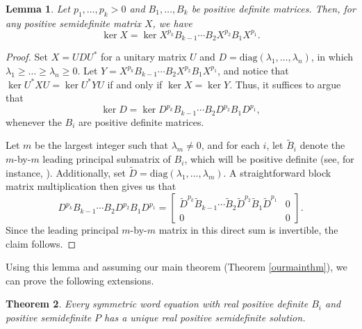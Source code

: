 \documentclass{amsart}
\newtheorem{thm}{Theorem}[section]
\newtheorem{lem}[thm]{Lemma}
\theoremstyle{definition}
\theoremstyle{remark}
\numberwithin{equation}{section}
\newcommand{\<}{\langle}
\renewcommand{\>}{\rangle}
\begin{document}
\begin{lem}\label{kerlemma}
Let $p_1,\ldots,p_k > 0$ and $B_1,\ldots,B_k$ be positive definite
matrices. Then, for any positive semidefinite matrix $X$, we have
\[ \ker X = \ker X^{p_{k}}B_{k-1}  \cdots B_2 X^{p_2}B_1 X^{p_1}.\]
\end{lem}

\begin{proof}
Set $X = UDU^*$ for a unitary matrix $U$ and $D = \text{diag}(\lambda_1,\ldots,\lambda_n)$, in which $\lambda_1 \geq \ldots \geq \lambda_n \geq 0$.  Let $Y=X^{p_{k}}B_{k-1} \cdots B_2 X^{p_2}B_1 X^{p_1}$, and notice that $\ker U^*XU = \ker U^*YU$ if and only if $\ker X = \ker Y$.  Thus, it suffices to argue that \[ \ker D = \ker D^{p_{k}}B_{k-1} \cdots B_2 D^{p_2} B_1 D^{p_1}, \] whenever the $B_i$ are positive definite matrices.

Let $m$ be the largest integer such that $\lambda_m  \neq 0$, and for each $i$, let $\widetilde B_i$ denote the $m$-by-$m$ leading principal submatrix of $B_i$, which will be positive definite (see, for instance, \cite[p.472]{HJ1}).  Additionally, set $\widetilde D = \text{diag}(\lambda_1,\ldots,\lambda_m)$.  A straightforward block matrix multiplication then gives us that \[D^{p_{k}} B_{k-1} \cdots B_2 D^{p_2} B_1 D^{p_1} = \left[\begin{array}{cc} \widetilde D^{p_{k}} \widetilde B_{k-1} \cdots \widetilde B_2 \widetilde D^{p_2} \widetilde B_1 \widetilde D^{p_1} 
 & 0 \\0 & 0\end{array}\right]. \]  Since the leading principal $m$-by-$m$ matrix in this direct sum is invertible, the claim follows.
\end{proof}

Using this lemma and assuming our main theorem (Theorem \ref{ourmainthm}), we can prove the following extensions.

\begin{thm} \label{mainthmpsd}
Every symmetric word equation with real positive definite $B_i$ and positive semidefinite $P$ has a unique real positive semidefinite solution.
\end{thm}
\end{document}
